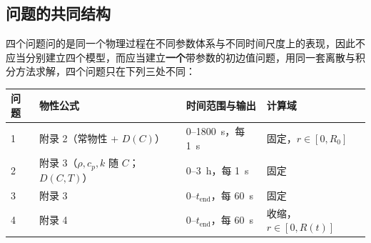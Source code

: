 \subsection{问题的共同结构}
四个问题问的是同一个物理过程在不同参数体系与不同时间尺度上的表现，因此不应当分别建立四个模型，而应当建立\textbf{一个}带参数的初边值问题，用同一套离散与积分方法求解，四个问题只在下列三处不同：

\begin{center}
\begin{tabular}{@{}llll@{}}
\toprule
问题 & 物性公式 & 时间范围与输出 & 计算域 \\
\midrule
1 & 附录 2（常物性 + $D(C)$） & $0$--\SI{1800}{\second}，每 \SI{1}{\second} & 固定，$r\in[0,R_0]$ \\
2 & 附录 3（$\rho,c_p,k$ 随 $C$；$D(C,T)$） & $0$--\SI{3}{\hour}，每 \SI{1}{\second} & 固定 \\
3 & 附录 3 & $0$--$t_{\mathrm{end}}$，每 \SI{60}{\second} & 固定 \\
4 & 附录 4 & $0$--$t_{\mathrm{end}}$，每 \SI{60}{\second} & 收缩，$r\in[0,R(t)]$ \\
\bottomrule
\end{tabular}
\end{center}

